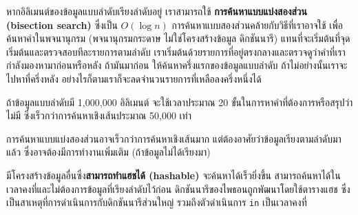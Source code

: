 
หากอิลิเมนต์ของข้อมูลแบบลำดับเรียงลำดับอยู่ 
เราสามารถใช้ {\bf การค้นหาแบบแบ่งสองส่วน (bisection search)} ซึ่งเป็น {\scriptsize$O(\log n)$} 
การค้นหาแบบสองส่วนคล้ายกับวิธีที่เราอาจใช้ เพื่อค้นหาคำในพจนานุกรม (พจนานุกรมกระดาษ ไม่ใช่โครงสร้างข้อมูล ดิกชันนารี) 
แทนที่จะเริ่มต้นที่จุดเริ่มต้นและตรวจสอบทีละรายการตามลำดับ 
เราเริ่มต้นด้วยรายการที่อยู่ตรงกลางและตรวจดูว่าคำที่เรากำลังมองหามาก่อนหรือหลัง 
ถ้ามันมาก่อน ให้ค้นหาครึ่งแรกของข้อมูลแบบลำดับ ถ้าไม่อย่างนั้นเราจะไปหาที่ครึ่งหลัง 
อย่างไรก็ตามเราก็จะลดจำนวนรายการที่เหลือลงครึ่งหนึ่งได้


ถ้าข้อมูลแบบลำดับมี 1,000,000 อิลิเมนต์ จะใช้เวลาประมาณ 20 ขั้นในการหาคำที่ต้องการหรือสรุปว่าไม่มี ซึ่งเร็วกว่าการค้นหาเชิงเส้นประมาณ 50,000 เท่า


การค้นหาแบบแบ่งสองส่วนอาจเร็วกว่าการค้นหาเชิงเส้นมาก แต่ต้องอาศัยว่าข้อมูลเรียงตามลำดับมาแล้ว ซึ่งอาจต้องมีการทำงานเพิ่มเติม (ถ้าข้อมูลไม่ได้เรียงมา)


มีโครงสร้างข้อมูลอื่นซึ่ง{\bf สามารถทำแฮชได้ (hashable)} จะค้นหาได้เร็วยิ่งขึ้น สามารถค้นหาได้ในเวลาคงที่และไม่ต้องการข้อมูลที่เรียงลำดับไว้ก่อน 
ดิกชันนารีของไพธอนถูกพัฒนาโดยใช้ตารางแฮช
ซึ่งเป็นสาเหตุที่การดำเนินการกับดิกชันนารีส่วนใหญ่ รวมถึงตัวดำเนินการ {\tt in} เป็นเวลาคงที่


